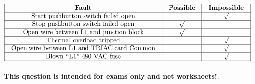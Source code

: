 






$$\vbox{\offinterlineskip
\halign{\strut
\vrule \quad\hfil # \ \hfil & 
\vrule \quad\hfil # \ \hfil & 
\vrule \quad\hfil # \ \hfil \vrule \cr
\noalign{\hrule}
%
{\bf Fault} & {\bf Possible} & {\bf Impossible} \cr
%
\noalign{\hrule}
%
Start pushbutton switch failed open &  & $\surd$ \cr
%
\noalign{\hrule}
%
Stop pushbutton switch failed open & $\surd$ &  \cr
%
\noalign{\hrule}
%
Open wire between L1 and junction block & $\surd$ &  \cr
%
\noalign{\hrule}
%
Thermal overload tripped &  & $\surd$ \cr
%
\noalign{\hrule}
%
Open wire between L1 and TRIAC card Common &  & $\surd$ \cr
%
\noalign{\hrule}
%
Blown ``L1'' 480 VAC fuse &  & $\surd$ \cr
%
\noalign{\hrule}
} %
}$$ %







{\bf This question is intended for exams only and not worksheets!}.


